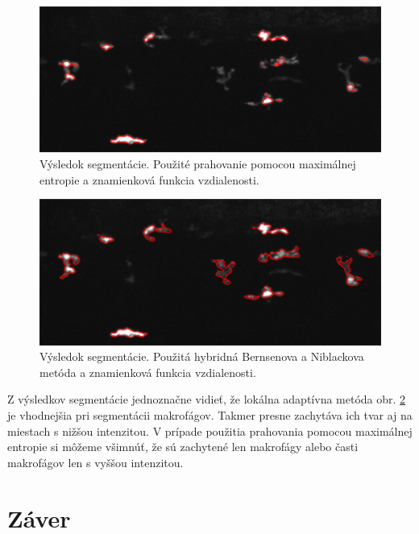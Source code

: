 \documentclass[a4paper,11pt,oneside]{article}%
\begin{document}
\begin{figure}[H]
 \begin{center} 
 \includegraphics[scale=0.50]{pics/vysek_kapur_res.png}
\caption{Výsledok segmentácie. Použité prahovanie pomocou maximálnej entropie a znamienková funkcia vzdialenosti.}
\label{fig:vysek_nb}
\end{center} 
\end{figure}

\begin{figure}[H]
 \begin{center} 
 \includegraphics[scale=0.50]{pics/vysek_hybrid_nb_res.png}
\caption{Výsledok segmentácie. Použitá hybridná Bernsenova a Niblackova metóda a znamienková funkcia vzdialenosti.}
\label{fig:vysek_nb}
\end{center} 
\end{figure}

Z výsledkov segmentácie jednoznačne vidieť, že lokálna adaptívna metóda obr. \ref{fig:vysek_nb} je vhodnejšia pri segmentácii makrofágov. Takmer presne zachytáva ich tvar aj na miestach s nižšou intenzitou. V prípade použitia prahovania pomocou maximálnej entropie si môžeme všimnúť, že sú zachytené len makrofágy alebo časti makrofágov len s vyššou intenzitou.

\newpage
\section{Záver}
\end{document}
